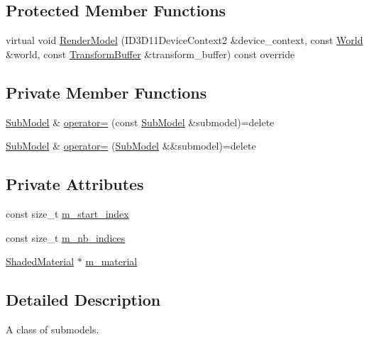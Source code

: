 \subsection*{Protected Member Functions}
\begin{DoxyCompactItemize}
\item 
virtual void \hyperlink{classmage_1_1_sub_model_a9dbfc5690b63cbf77d3e1d2c9a87d07a}{Render\+Model} (I\+D3\+D11\+Device\+Context2 \&device\+\_\+context, const \hyperlink{classmage_1_1_world}{World} \&world, const \hyperlink{structmage_1_1_transform_buffer}{Transform\+Buffer} \&transform\+\_\+buffer) const override
\end{DoxyCompactItemize}
\subsection*{Private Member Functions}
\begin{DoxyCompactItemize}
\item 
\hyperlink{classmage_1_1_sub_model}{Sub\+Model} \& \hyperlink{classmage_1_1_sub_model_aafc8b4ba509ec78ea36719e98b1a0c99}{operator=} (const \hyperlink{classmage_1_1_sub_model}{Sub\+Model} \&submodel)=delete
\item 
\hyperlink{classmage_1_1_sub_model}{Sub\+Model} \& \hyperlink{classmage_1_1_sub_model_a616b8007e767deebc248485fb8d26773}{operator=} (\hyperlink{classmage_1_1_sub_model}{Sub\+Model} \&\&submodel)=delete
\end{DoxyCompactItemize}
\subsection*{Private Attributes}
\begin{DoxyCompactItemize}
\item 
const size\+\_\+t \hyperlink{classmage_1_1_sub_model_a22db3ac71a33ed64a26bb2e4410eeb28}{m\+\_\+start\+\_\+index}
\item 
const size\+\_\+t \hyperlink{classmage_1_1_sub_model_a0471b8b0c4b7be0e696378238b25e7e7}{m\+\_\+nb\+\_\+indices}
\item 
\hyperlink{structmage_1_1_shaded_material}{Shaded\+Material} $\ast$ \hyperlink{classmage_1_1_sub_model_ac32eea7a1db56906ebf63b8683231999}{m\+\_\+material}
\end{DoxyCompactItemize}


\subsection{Detailed Description}
A class of submodels. 

